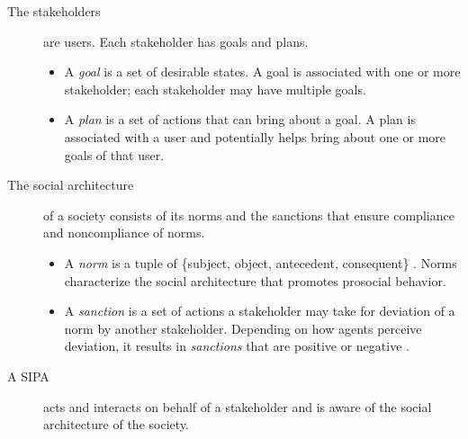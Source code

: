 \documentclass[11pt,          %
               phd,           %
               onehalfspacing %
               ]{ncsuthesis}
\newcommand{\frameworkB}{Poros\xspace}
\begin{document}

\begin{description}
\item[The stakeholders] are users. Each stakeholder has goals and plans.

\begin{itemize}[nosep]
  \item A \emph{goal} is a set of desirable states. A goal is
    associated with one or more stakeholder; each stakeholder may have multiple
    goals.
  \item A \emph{plan} is a set of actions that can bring about a goal.
    A plan is associated with a user and potentially helps bring about 
    one or more goals of that user.
\end{itemize}

\item[The social architecture] of a society consists of its norms
and the sanctions that ensure compliance and noncompliance of norms.

\begin{itemize}[nosep]
  \item A \emph{norm} is a tuple of \{subject, object, antecedent, consequent\} \citep{Singh-2013-Norms}. 
    Norms  characterize the social architecture that promotes prosocial behavior. 
  \item A \emph{sanction} is a set of actions a stakeholder may take
    for deviation of a norm by another stakeholder.  Depending on how
    agents perceive deviation, it results in \emph{sanctions} that are
    positive or negative \citep{Nardin-KER16-Classifying}.
\end{itemize}

\item[A SIPA] acts and interacts on behalf of a stakeholder and
is aware of the social architecture of the society.


\end{description}
\end{document}
